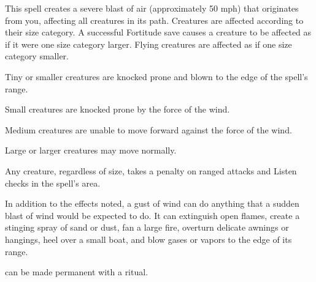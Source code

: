 \begin{spelleffect}
  This spell creates a severe blast of air (approximately 50 mph) that originates from you, affecting all creatures in its path. Creatures are affected according to their size category. A successful Fortitude save causes a creature to be affected as if it were one size category larger. Flying creatures are affected as if one size category smaller.
  \begin{itemize*}
    \item Tiny or smaller creatures are knocked prone and blown to the edge of the spell's range.
    \item Small creatures are knocked prone by the force of the wind.
    \item Medium creatures are unable to move forward against the force of the wind.
    \item Large or larger creatures may move normally.
  \end{itemize*}
  \par Any creature, regardless of size, takes a  penalty on ranged attacks and Listen checks in the spell's area.
  \par In addition to the effects noted, a gust of wind can do anything that a sudden blast of wind would be expected to do. It can extinguish open flames, create a stinging spray of sand or dust, fan a large fire, overturn delicate awnings or hangings, heel over a small boat, and blow gases or vapors to the edge of its range.
\end{spelleffect}
\begin{spellnotes}
   can be made permanent with a  ritual.
\end{spellnotes}

\begin{comment}
\subsubsection{H}
\end{comment}

